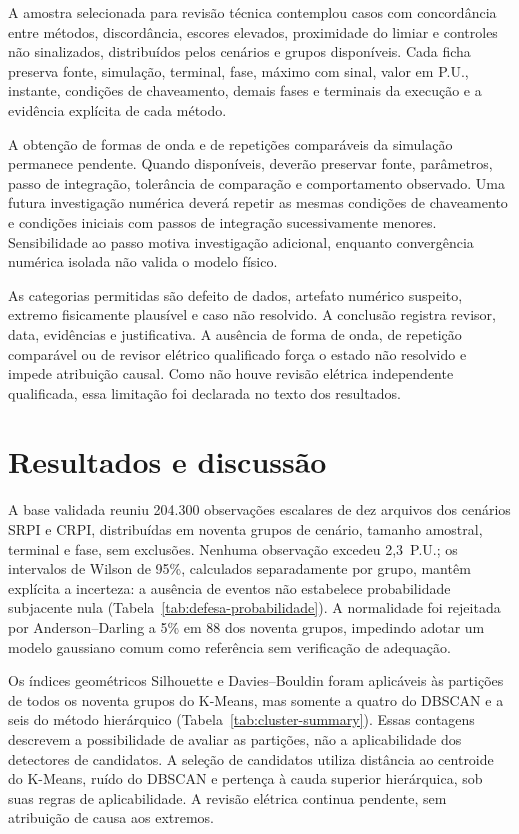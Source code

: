 \documentclass[
	12pt,				%
	openright,			%
	oneside,			%
	a4paper,			%
	chapter=TITLE,		%
	section=TITLE,		%
	subsection=TITLE,	%
	subsubsection=TITLE,%
	english,			%
	brazilian			%
	]{abntex2}
\theoremstyle{definition}
\begin{document}
A amostra selecionada para revisão técnica contemplou casos com concordância entre métodos,
discordância, escores elevados, proximidade do limiar e controles não
sinalizados, distribuídos pelos cenários e grupos disponíveis. Cada ficha
preserva fonte, simulação, terminal, fase, máximo com sinal, valor em P.U.,
instante, condições de chaveamento, demais fases e terminais da execução e a
evidência explícita de cada método.

A obtenção de formas de onda e de repetições comparáveis da simulação
permanece pendente. Quando disponíveis, deverão preservar fonte, parâmetros,
passo de integração, tolerância de comparação e comportamento observado.
Uma futura investigação numérica deverá repetir as mesmas condições
de chaveamento e condições iniciais com passos de integração sucessivamente
menores. Sensibilidade ao passo motiva investigação adicional, enquanto
convergência numérica isolada não valida o modelo físico.

As categorias permitidas são defeito de dados, artefato numérico suspeito,
extremo fisicamente plausível e caso não resolvido. A conclusão registra
revisor, data, evidências e justificativa. A ausência de forma de onda, de
repetição comparável ou de revisor elétrico qualificado força o estado não
resolvido e impede atribuição causal. Como não houve revisão elétrica
independente qualificada, essa limitação foi declarada no texto dos
resultados.

\chapter{Resultados e discussão}
\label{chap:results}

A base validada reuniu 204.300 observações escalares de dez arquivos dos
cenários SRPI e CRPI, distribuídas em noventa grupos de cenário, tamanho
amostral, terminal e fase, sem exclusões. Nenhuma observação excedeu
2,3~P.U.; os intervalos de Wilson de 95\%, calculados separadamente por
grupo, mantêm explícita a incerteza: a ausência de eventos não estabelece
probabilidade subjacente nula (Tabela~\ref{tab:defesa-probabilidade}).
A normalidade foi rejeitada por Anderson--Darling a 5\% em 88 dos noventa
grupos, impedindo adotar um modelo gaussiano comum como referência sem
verificação de adequação.

Os índices geométricos Silhouette e Davies--Bouldin foram aplicáveis às
partições de todos os noventa grupos do K-Means, mas somente a quatro do
DBSCAN e a seis do método hierárquico
(Tabela~\ref{tab:cluster-summary}). Essas contagens descrevem a possibilidade
de avaliar as partições, não a aplicabilidade dos detectores de candidatos.
A seleção de candidatos utiliza distância ao centroide do K-Means,
ruído do DBSCAN e pertença à cauda superior hierárquica, sob suas regras
de aplicabilidade. A revisão elétrica
continua pendente, sem atribuição de causa aos extremos.
\end{document}
